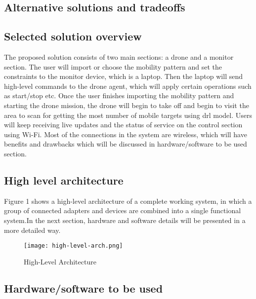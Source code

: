 \documentclass[../main.tex]{subfiles}
\begin{document}
\subsection{Alternative solutions and tradeoffs}

\subsection{Selected solution overview}

The proposed solution consists of two main sections: a drone and a monitor section. The user will import or choose 
the mobility pattern and set the constraints to the monitor device, which is a laptop. Then the laptop will send high-level commands to the drone agent, which will apply certain operations such as start/stop etc. Once the user finishes importing the mobility pattern and starting the drone mission, the drone will begin to take off and begin to visit the area to scan for getting the most number of mobile targets using \gls{drl} model. Users will keep receiving live updates and the status of service on the control section using Wi-Fi. Most of the connections in the system are wireless, which will have benefits and drawbacks which will be discussed in hardware/software to be used section.


\subsection{High level architecture}
Figure 1 shows a high-level architecture of a complete working system, in which a group of connected adapters and devices are combined into a single functional system.In the next section, hardware and software details will be presented in a more detailed way.
\begin{figure}[H]
	\centering
	\texttt{[image: high-level-arch.png]}
	\caption{High-Level Architecture}\label{fig1:arch-fig}
\end{figure}


\subsection{Hardware/software to be used}
\end{document}
